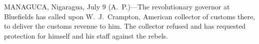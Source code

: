 
MANAGUCA, Nigaragua, July 9 (A.~P.)---The revolutionary governor at
Bluefields has called upon W.~J.~Crampton, American collector of
customs there, to deliver the customs revenue to him.  The collector
refused and has requested protection for himself and his staff against
the rebels.
